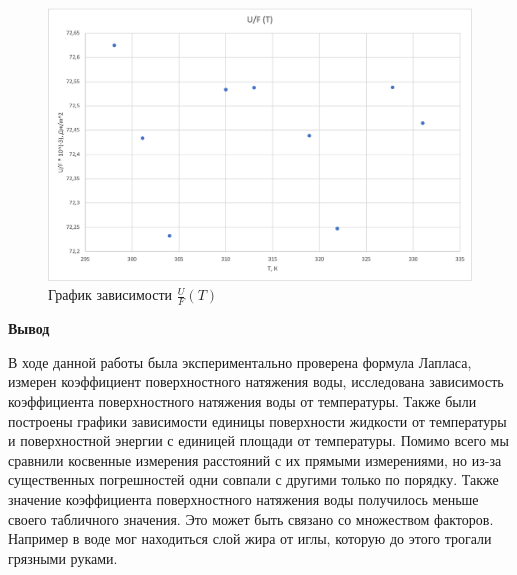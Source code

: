 \documentclass[a4paper, 12pt]{article}
\begin{document}
\begin{enumerate}
        \begin{figure}[ht]
            \centering
            \includegraphics[width=0.75\linewidth]{images/UF_(T).png}
            \caption{График зависимости $\frac{U}{F}(T)$}
            \label{pic4}
        \end{figure}
        
    \end{enumerate}
    
    \newpage
    
    \begin{flushleft}
        {\Large {\bf Вывод}}
    \end{flushleft}
    
    В ходе данной работы была экспериментально проверена формула Лапласа, измерен коэффициент поверхностного натяжения воды, исследована зависимость коэффициента поверхностного натяжения воды от температуры. Также были построены графики зависимости единицы поверхности жидкости от температуры и поверхностной энергии с единицей площади от температуры. Помимо всего мы сравнили косвенные измерения расстояний с их прямыми измерениями, но из-за существенных погрешностей одни совпали с другими только по порядку. Также значение коэффициента поверхностного натяжения воды получилось меньше своего табличного значения. Это может быть связано со множеством факторов. Например в воде мог находиться слой жира от иглы, которую до этого трогали грязными руками. 
\end{document}
